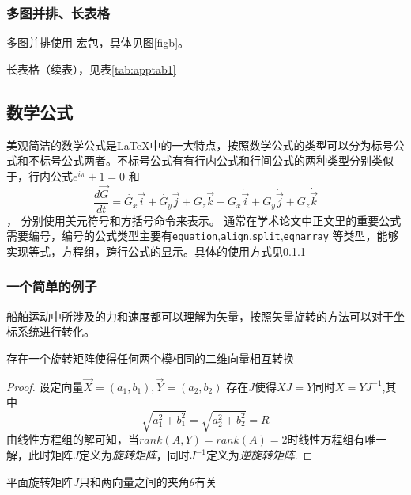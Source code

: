 \subsubsection{多图并排、长表格}

多图并排使用 宏包，具体见图\ref{figb}。

长表格（续表），见表\ref{tab:apptab1}

\subsection{数学公式}

美观简洁的数学公式是\LaTeX 中的一大特点，按照数学公式的类型可以分为标号公式和不标号公式两者。不标号公式有有行内公式和行间公式的两种类型分别类似于，行内公式$ e^{i\pi}+1=0 $ 和\[ \dfrac{d\vec{G}}{dt}=\dot{G_x}\vec{i}+\dot{G_y}\vec{j}+\dot{G_z}\vec{k}+G_x\dot{\vec{i}}+G_y\dot{\vec{j}}+G_z\dot{\vec{k}} \]，
分别使用美元符号和方括号命令来表示。 通常在学术论文中正文里的重要公式需要编号，编号的公式类型主要有\verb|equation|,\verb|align|,\verb|split|,\verb|eqnarray| 等类型，能够实现等式，方程组，跨行公式的显示。具体的使用方式见\ref{example}
\subsubsection{一个简单的例子}\label{example}
船舶运动中所涉及的力和速度都可以理解为矢量，按照矢量旋转的方法可以对于坐标系统进行转化。
\begin{lemma}
	\label{2Drot}
	存在一个旋转矩阵使得任何两个模相同的二维向量相互转换
\end{lemma}
\begin{proof}
	设定向量$\vec{X}=(a_1,b_1),\vec{Y}=(a_2,b_2)$ 存在$ J $使得$ XJ=Y $同时$X=YJ^{-1}$,其中\[  \sqrt{a_1^{2}+b_1^{2}}=\sqrt{a_2^{2}+b_2^{2}}=R \]
	由线性方程组的解可知，当$rank(A,Y)=rank(A)=2$时线性方程组有唯一解，此时矩阵$ J $定义为\textit{旋转矩阵}，同时$ J^{-1} $定义为\textit{逆旋转矩阵}.
\end{proof}
\begin{theorem}
	\label{rotM}
	平面旋转矩阵$ J $只和两向量之间的夹角$ \theta $有关
\end{theorem}

